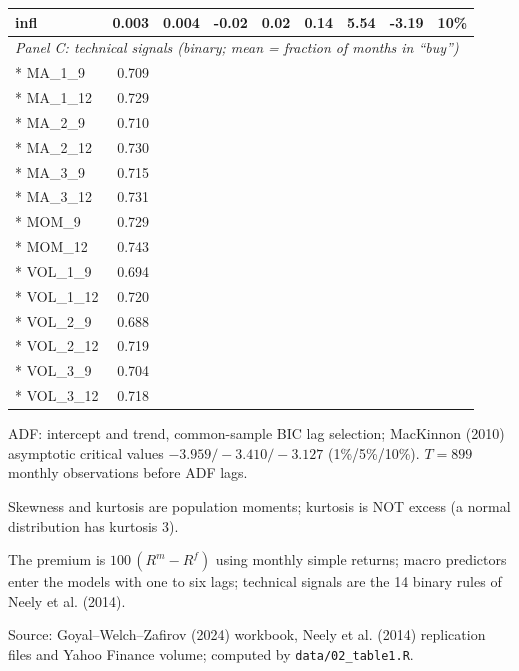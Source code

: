 \begin{longtable}{lrrrrrrrc}
infl & 0.003 & 0.004 & -0.02 & 0.02 & 0.14 & 5.54 & -3.19 & 10\% \\
\midrule
\multicolumn{9}{l}{\emph{Panel C: technical signals (binary; mean = fraction of months in ``buy'')}} \\*
MA\_1\_9 & 0.709 & & & & & & & \\*
MA\_1\_12 & 0.729 & & & & & & & \\*
MA\_2\_9 & 0.710 & & & & & & & \\*
MA\_2\_12 & 0.730 & & & & & & & \\*
MA\_3\_9 & 0.715 & & & & & & & \\*
MA\_3\_12 & 0.731 & & & & & & & \\*
MOM\_9 & 0.729 & & & & & & & \\*
MOM\_12 & 0.743 & & & & & & & \\*
VOL\_1\_9 & 0.694 & & & & & & & \\*
VOL\_1\_12 & 0.720 & & & & & & & \\*
VOL\_2\_9 & 0.688 & & & & & & & \\*
VOL\_2\_12 & 0.719 & & & & & & & \\*
VOL\_3\_9 & 0.704 & & & & & & & \\*
VOL\_3\_12 & 0.718 & & & & & & & \\
\end{longtable}
\endgroup
\begin{list}{}{\setlength{\leftmargin}{0pt}\setlength{\itemsep}{0pt}\setlength{\topsep}{0pt}}
\item ADF: intercept and trend, common-sample BIC lag selection; MacKinnon (2010) asymptotic critical values $-3.959/-3.410/-3.127$ (1\%/5\%/10\%). $T=899$ monthly observations before ADF lags.
\item Skewness and kurtosis are population moments; kurtosis is NOT excess (a normal distribution has kurtosis 3).
\item The premium is $100\,(R^m-R^f)$ using monthly simple returns; macro predictors enter the models with one to six lags; technical signals are the 14 binary rules of Neely et al. (2014).
\item Source: Goyal--Welch--Zafirov (2024) workbook, Neely et al. (2014) replication files and   Yahoo Finance volume; computed by \texttt{data/02\_table1.R}.
\end{list}
\medskip
